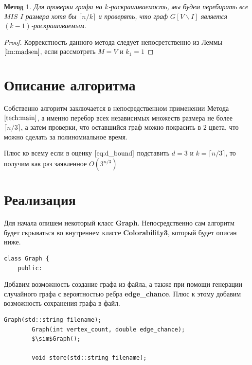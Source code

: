 \documentclass[12pt]{article}
\newtheorem{technique}{Метод}
\begin{document}
\begin{technique}\label{tech:main}
Для проверки графа на $k$-раскрашиваемость, мы будем перебирать все $MIS$ $I$ размера хотя бы $\lceil n / k \rceil$ и проверять, что граф $G\left[V \backslash I\right]$ является $\left(k - 1\right)$-рас\-кра\-ши\-ва\-е\-мым.
\end{technique}
\begin{proof}
Коррекстность данного метода следует непосретственно из Леммы $\ref{lm:madsen}$, если рассмотреть $M = V$ и $k_1 = 1$
\end{proof}

\section{Описание алгоритма}

Собственно алгоритм заключается в непосредственном применении Метода $\ref{tech:main}$, а имен\-но перебор всех независимых множеств размера не более $\lceil n/3 \rceil$, а затем проверки, что оставшийся граф можно покрасить в $2$ цвета, что можно сделать за полиномиальное время.

Плюс ко всему если в оценку $\eqref{eq:d_bound}$ подставить $d = 3$ и $k = \lceil n / 3 \rceil$, то получим как раз заявленное $O\left(3^{n / 3}\right)$

\section{Реализация}
Для начала опишем некоторый класс \textbf{Graph}. Непосредственно сам алгоритм будет скрываться во внутреннем классе \textbf{Colorability3}, который будет описан ниже.
\begin{lstlisting}[mathescape=true]
    class Graph {
    public:
\end{lstlisting}

Добавим возможность создание графа из файла, а также при помощи генерации случайного графа с вероятностью ребра \textbf{edge\_chance}. Плюс к этому добавим воз\-мож\-ность сохранения графа в файл.

\begin{lstlisting}[mathescape=true]
        Graph(std::string filename);
        Graph(int vertex_count, double edge_chance);
        $\sim$Graph();
        
        void store(std::string filename);
\end{lstlisting}  
\end{document}
